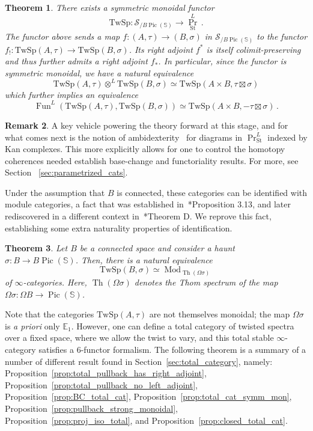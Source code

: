 \documentclass[10pt]{amsart}
\theoremstyle{plain}
\newtheorem{theorem}{Theorem}[subsection]
\theoremstyle{definition}
\newtheorem{rmk}[theorem]{Remark}
\DeclareMathOperator{\Mod}{Mod}
\DeclareMathOperator{\Fun}{Fun}
\DeclareMathOperator{\Th}{Th}
\DeclareMathOperator{\Pic}{Pic}
\def\on{\operatorname}
\newcommand{\St}{\mathrm{St}}
\newcommand{\bE}{\mathbb{E}}
\newcommand{\bS}{\mathbb{S}}
\newcommand{\TwSp}{\mathrm{TwSp}}
\newcommand{\cS}{\mathcal{S}}
\begin{document}
\begin{theorem}
    There exists a symmetric monoidal functor
    \[
    \TwSp: \cS_{/B \Pic(\bS)} \to \on{Pr}^{L}_{\St} \,.
    \]
The functor above sends a map $f: (A, \tau) \to (B, \sigma)$ in $\cS_{/ B \Pic(\bS)}$ to the functor $f_!: \TwSp(A, \tau) \to \TwSp(B, \sigma)$. Its right adjoint $f^*$ is itself colimit-preserving and thus further admits a right adjoint $f_*$.
In particular, since the functor is symmetric monoidal, we have a natural equivalence
\[
\TwSp(A, \tau) \otimes^{L} \TwSp(B, \sigma) \simeq \TwSp(A \times B, \tau \boxtimes \sigma)
\]
which further implies an equivalence
\[
\Fun^{L}(\TwSp(A, \tau), \TwSp(B, \sigma)) \simeq \TwSp(A \times B, - \tau \boxtimes \sigma) \,.
\]
\end{theorem}

\begin{rmk}
    A key vehicle powering the theory forward at this stage, and for what comes next is the notion of ambidexterity~\cite{HL13} for diagrams in $\on{Pr}^L_{\St}$ indexed by Kan complexes.
    This more explicitly allows for one to control the homotopy coherences needed establish base-change and functoriality results.
    For more, see Section ~\ref{sec:parametrized_cats}.
\end{rmk}

  Under the assumption that $B$ is connected, these categories can be identified with module categories, a fact that was established in~\cite{Dou05}*{Proposition 3.13}, and later rediscovered in a different context in~\cite{CCRY23}*{Theorem D}.
    We reprove this fact, establishing some extra naturality properties of identification.

    \begin{theorem}
      Let $B$ be a connected space and consider a haunt $\sigma : B \to B\Pic(\bS)$.
      Then, there is a natural equivalence
      \[
      \TwSp(B,\sigma) \simeq \Mod_{\Th(\Omega \sigma)}
      \]
      of $\infty$-categories. Here, $\Th(\Omega \sigma)$ denotes the Thom spectrum of the map $\Omega \sigma : \Omega B \to \Pic(\bS)$.
    \end{theorem}

  Note that the categories $\TwSp(A,\tau)$ are not themselves monoidal; the map $\Omega \sigma$ is \emph{a priori} only $\bE_1$.
  However, one can define a total category of twisted spectra over a fixed space, where we allow the twist to vary, and this total stable $\infty$-category satisfies a 6-functor formalism.
  The following theorem is a summary of a number of different result found in Section~\ref{sec:total_category}, namely:
  Proposition~\ref{prop:total_pullback_has_right_adjoint}, Proposition~\ref{prop:total_pullback_no_left_adjoint},
  Proposition~\ref{prop:BC_total_cat},
  Proposition~\ref{prop:total_cat_symm_mon},
  Proposition~\ref{prop:pullback_strong_monoidal},
  Proposition~\ref{prop:proj_iso_total},
  and Proposition~\ref{prop:closed_total_cat}.
\end{document}
